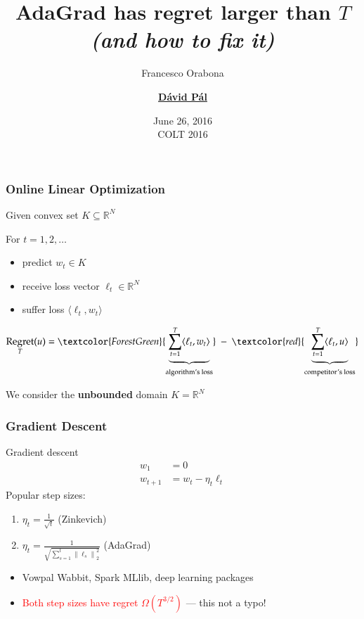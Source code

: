 \documentclass[usenames,dvipsnames]{beamer}
\title{AdaGrad has regret larger than $T$ \\ \textit{(and how to fix it)}}
\date{June 26, 2016 \vspace{0.5cm} \\ \tiny COLT 2016}
\author{Francesco Orabona \and \underline{\textbf{D\'avid P\'al}}}
\institute{Yahoo Research, New York}
\DeclareMathOperator{\Regret}{Regret}
\newcommand{\R}{\mathbb{R}}
\newcommand{\norm}[1]{\left\|#1\right\|}
\begin{document}
\begin{frame}
\maketitle
\end{frame}

\begin{frame}
\frametitle{Online Linear Optimization}

Given convex set $K \subseteq \R^N$

\vspace{0.3cm}

For $t=1,2,\dots$
\begin{itemize}
\item predict $w_t \in K$
\item receive loss vector $\ell_t \in \R^N$
\item suffer loss $\langle \ell_t, w_t \rangle$
\end{itemize}

\vspace{0.3cm}
$$
\Regret_T(u) = \textcolor{ForestGreen}{\underbrace{\sum_{t=1}^T \langle \ell_t, w_t \rangle}_{\text{algorithm's loss}}} \ - \ \textcolor{red}{\underbrace{\sum_{t=1}^T \langle \ell_t, u \rangle}_{\text{competitor's loss}}}
$$

\vspace{0.3cm}

We consider the \textbf{unbounded} domain $K = \R^N$
\end{frame}

\begin{frame}
\frametitle{Gradient Descent}

Gradient descent
\begin{align*}
w_1 & = 0 \\
w_{t+1} & = w_t - \eta_t \ell_t
\end{align*}
Popular step sizes:
\begin{enumerate}
\item $\eta_t = \frac{1}{\sqrt{t}}$ \qquad \qquad \qquad (Zinkevich)
\item $\eta_t = \frac{1}{\sqrt{\sum_{s=1}^t \norm{\ell_s}_2^2}}$ \quad \qquad (AdaGrad)
\end{enumerate}

\vspace{1cm}

\begin{itemize}
\item Vowpal Wabbit, Spark MLlib, deep learning packages
\item \textcolor{red}{Both step sizes have regret $\Omega(T^{3/2})$} --- this not a typo!
\end{itemize}
\end{frame}
\end{document}
